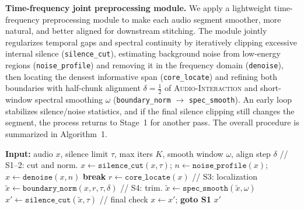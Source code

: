 \documentclass{llmxive}
\begin{document}
\noindent
\begin{minipage}[t]{0.5\textwidth}
\textbf{Time-frequency joint preprocessing module.} We apply a lightweight time-frequency preprocessing module to make each audio segment smoother, more natural, and better aligned for downstream stitching. The module jointly regularizes temporal gaps and spectral continuity by iteratively clipping excessive internal silence (\texttt{silence\_cut}), estimating background noise from low-energy regions (\texttt{noise\_profile}) and removing it in the frequency domain (\texttt{denoise}), then locating the densest informative span (\texttt{core\_locate}) and refining both boundaries with half-chunk alignment $\delta=\frac{1}{2}$ of \textsc{Audio-Interaction} and short-window spectral smoothing $\omega$ (\texttt{boundary\_norm} $\rightarrow$ \texttt{spec\_smooth}). An early loop stabilizes silence/noise statistics, and if the final silence clipping still changes the segment, the process returns to Stage~1 for another pass. The overall procedure is summarized in Algorithm~1.

\end{minipage}
\hfill
\begin{minipage}[t]{0.48\textwidth}
\vspace{-12pt}
\footnotesize

\begin{algorithm}[H]
\caption{TFJP Module Pipeline}
\begin{algorithmic}[1]
\State \textbf{Input:} audio $x$, silence limit $\tau$, max iters $K$, smooth window $\omega$, align step $\delta$
    \hfill {// S1--2: cut and norm.}
    \State $x \gets \texttt{silence\_cut}(x,\tau)$; $n \gets \texttt{noise\_profile}(x)$; $x \gets \texttt{denoise}(x,n)$
     \textbf{break} \EndIf
\EndFor
\State $r \gets \texttt{core\_locate}(x)$ \hfill {// S3: localization}
\State $\tilde{x} \gets \texttt{boundary\_norm}(x,r,\tau,\delta)$ \hfill {// S4: trim.}
\State $\tilde{x} \gets \texttt{spec\_smooth}(\tilde{x},\omega)$
\State $x' \gets \texttt{silence\_cut}(\tilde{x},\tau)$ \hfill {// final check}
 $x \gets x'$; \textbf{goto S1} \Else \Return $x'$ \EndIf
\end{algorithmic}
\end{algorithm}

\end{minipage}
\end{document}
